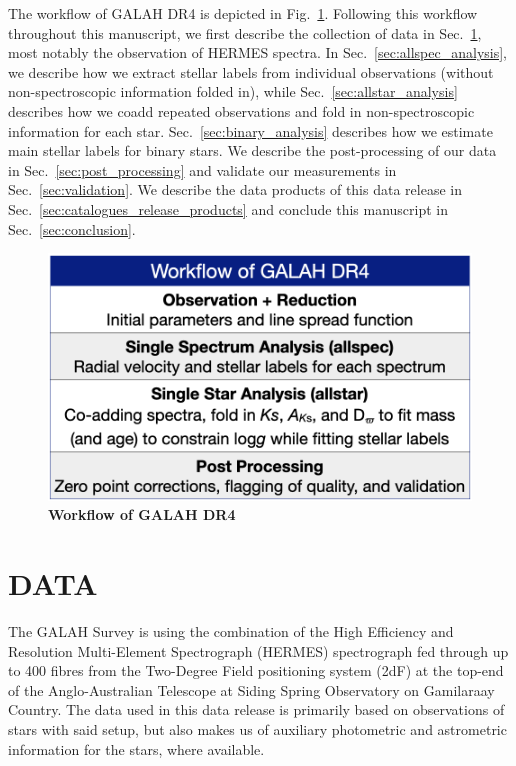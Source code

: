 \documentclass[
  journal=pasa,
  manuscript=research-paper, %
  year=2023,
  volume=37
]{cup-journal}
\begin{document}
The workflow of GALAH DR4 is depicted in Fig.~\ref{fig:workflow_galah_dr4}. Following this workflow throughout this manuscript, we first describe the collection of data in Sec.~\ref{sec:data}, most notably the observation of HERMES spectra. In Sec.~\ref{sec:allspec_analysis}, we describe how we extract stellar labels from individual observations (without non-spectroscopic information folded in), while Sec.~\ref{sec:allstar_analysis} describes how we coadd repeated observations and fold in non-spectroscopic information for each star. Sec.~\ref{sec:binary_analysis} describes how we estimate main stellar labels for binary stars. We describe the post-processing of our data in Sec.~\ref{sec:post_processing} and validate our measurements in Sec.~\ref{sec:validation}. We describe the data products of this data release in Sec.~\ref{sec:catalogues_release_products} and conclude this manuscript in Sec.~\ref{sec:conclusion}.

\begin{figure}[hbt!]
 \centering
 \includegraphics[width=\textwidth]{figures/workflow_galah_dr4.png}
 \caption{\textbf{Workflow of GALAH DR4}}
 \label{fig:workflow_galah_dr4}
\end{figure}

\newpage
\section{DATA}
\label{sec:data}

The GALAH Survey is using the combination of the High Efficiency and Resolution Multi-Element Spectrograph (HERMES) spectrograph \citep{Sheinis2015} fed through up to 400 fibres from the Two-Degree Field positioning system (2dF) at the top-end \citep{Lewis2002} of the Anglo-Australian Telescope at Siding Spring Observatory on Gamilaraay Country. The data used in this data release is primarily based on observations of stars with said setup, but also makes us of auxiliary photometric and astrometric information for the stars, where available.
\end{document}
